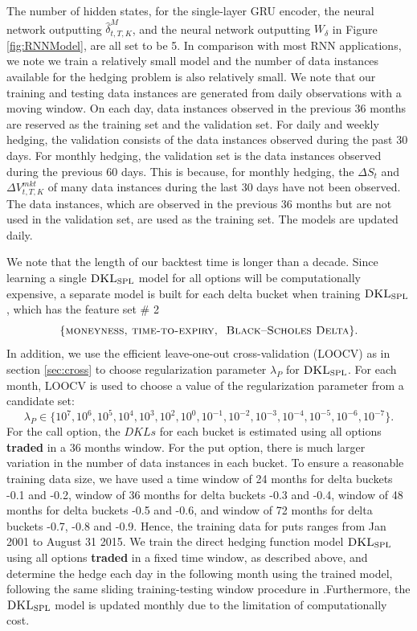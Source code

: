 \documentclass[letterpaper,12pt,titlepage,oneside,final]{book}
\numberwithin{equation}{section}
\theoremstyle{definition}
\newcommand{\DS}{\Delta S}
\newcommand{\DKLs}{\bf\textsc{DKL}_{\text{SPL}}}
\begin{document}
The number of hidden states, for the single-layer GRU encoder, the neural network outputting $\widehat{\delta}^M_{t,T,K}$, and the neural network outputting $W_{\delta}$  in Figure \ref{fig:RNNModel}, are all set to be 5.   In comparison with most RNN applications, we note we train a relatively small model and the number of data instances available for the hedging problem is also relatively small.
We note that our training and testing data instances are generated from daily observations with a moving window.  On each day, data instances observed in the previous 36 months are reserved as the training set and the validation set. For daily and weekly hedging, the validation consists of the data instances observed during the past 30 days. For monthly hedging, the validation set is the data instances observed during the previous 60 days. This is because, for monthly hedging, the  $\DS_t$ and $\Delta V^{mkt}_{t,T,K}$  of many data instances during the last 30 days have not been observed.
The data instances, which are observed in the previous 36 months but are not used in the validation set, are used as the training set.
The models are updated daily.





We note that the length of our backtest time is longer than a decade.
 Since
learning a single $\DKLs$ model for all options will be computationally expensive,   a separate model is built for each delta bucket when training $\DKLs$, which has the feature set \# 2
 $$\{\textsc{moneyness,~time-to-expiry,~ Black–Scholes Delta}\}.$$
 In addition,  we use the efficient leave-one-out cross-validation (LOOCV) as in section \ref{sec:cross} to choose regularization parameter $\lambda_P$ for $\DKLs$. For each month, LOOCV is used to choose a  value of the regularization parameter from a candidate set:
$$\lambda_P \in \{10^7,10^6,10^5,10^4,10^3,10^2,10^0,10^{-1},10^{-2}, 10^{-3},10^{-4},10^{-5},10^{-6},10^{-7} \}.$$
For the call option, the  $DKLs$ for each bucket is estimated  using all options \textbf{traded} in a 36 months window. For the put option, there is much larger variation in the number of data instances in each bucket.
 To ensure a reasonable training data size, we have used a time window of 24 months for delta buckets -0.1 and -0.2,   window of 36 months for delta buckets -0.3 and -0.4,  window of 48 months  for delta buckets -0.5 and -0.6, and window of 72 months  for delta buckets -0.7, -0.8 and -0.9. Hence, the training data  for puts ranges from  Jan 2001 to August 31 2015.
We train the direct hedging function model $\DKLs$ using all options \textbf{traded} in a fixed time window, as described above, and determine the hedge each day in the following month using the trained model, following the same sliding training-testing window procedure in \citep{hulloptimal}.Furthermore, the  $\DKLs$  model is updated monthly due to the limitation of computationally cost.
\end{document}
